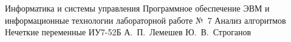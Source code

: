 \makereporttitle
    {Информатика и системы управления}
    {Программное обеспечение ЭВМ и информационные технологии}
    {лабораторной работе №~7}
    {Анализ алгоритмов}
    {Нечеткие переменные}
    {}
    {ИУ7-52Б}
    {А.~П.~Лемешев}
    {Ю.~В.~Строганов}
    {}
